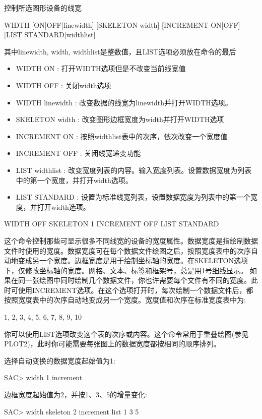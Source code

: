\label{cmd:width}

控制所选图形设备的线宽

\begin{SACSTX}
WIDTH  [ON|OFF|linewidth] [SKELETON width] [INCREMENT ON|OFF] 
    [LIST STANDARD|widthlist]
\end{SACSTX}
其中linewidth, width, widthlist是整数值，且LIST选项必须放在命令的最后

\begin{itemize}
\item WIDTH ON : 打开WIDTH选项但是不改变当前线宽值 
\item WIDTH OFF : 关闭width选项 
\item WIDTH linewidth : 改变数据的线宽为linewidth并打开WIDTH选项。 
\item SKELETON width : 改变图形边框宽度为width并打开WIDTH选项 
\item INCREMENT {ON} : 按照widthlist表中的次序，依次改变一个宽度值 
\item INCREMENT OFF : 关闭线宽递变功能 
\item LIST widthlist : 改变宽度列表的内容。输入宽度列表。设置数据宽度为列表中的第一个宽度，并打开width选项。 
\item LIST STANDARD : 设置为标准线宽列表，设置数据宽度为列表中的第一个宽度，并打开width选项。 
\end{itemize}

\begin{SACDFT}
WIDTH OFF SKELETON 1 INCREMENT OFF LIST STANDARD
\end{SACDFT}

这个命令控制那些可显示很多不同线宽的设备的宽度属性。数据宽度是指绘制数据文件时使用的宽度。数据宽度可在每个数据文件绘图之后，按照宽度表中的次序自动地变成另一个宽度。边框宽度是用于绘制坐标轴的宽度。在SKELETON选项下，仅修改坐标轴的宽度。网格、文本、标签和框架号，总是用1号细线显示。
如果在同一张绘图中同时绘制几个数据文件，你也许需要每个文件有不同的宽度。此时可使用INCREMENT选项。在这个选项打开时，每次绘制一个数据文件后，都按照宽度表中的次序自动地变成另一个宽度。宽度值和次序在标准宽度表中为:
\begin{SACCode}
1, 2, 3, 4, 5, 6, 7, 8, 9, 10
\end{SACCode}
你可以使用LIST选项改变这个表的次序或内容。这个命令常用于重叠绘图(参见PLOT2)，此时你可能需要每张图上的数据宽度都按相同的顺序排列。

选择自动变换的数据宽度起始值为1:
\begin{SACCode}
SAC> width 1 increment
\end{SACCode}

边框宽度起始值为2，并按1、3、5的增量变化:
\begin{SACCode}
SAC> width skeleton 2 increment list 1 3 5
\end{SACCode}
